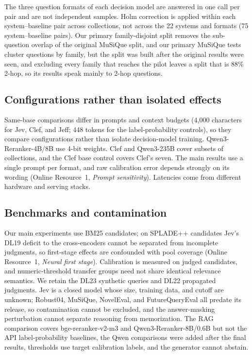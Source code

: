 The three question formats of each decision model are answered in one call per pair and are not independent samples. Holm correction is applied within each system--baseline pair across collections, not across the 22 systems and formats (75 system--baseline pairs). Our primary family-disjoint split removes the sub-question overlap of the original MuSiQue split, and our primary MuSiQue tests cluster questions by family, but the split was built after the original results were seen, and excluding every family that reaches the pilot leaves a split that is 88\% 2-hop, so its results speak mainly to 2-hop questions.

\subsection{Configurations rather than isolated effects}

Same-base comparisons differ in prompts and context budgets (4{,}000 characters for Jev, Clef, and Jeff; 448 tokens for the label-probability controls), so they compare configurations rather than isolate decision-model training. Qwen3-Reranker-4B/8B use 4-bit weights. Clef and Qwen3-235B cover subsets of collections, and the Clef base control covers Clef's seven. The main results use a single prompt per format, and raw calibration error depends strongly on its wording (Online Resource~1, \emph{Prompt sensitivity}). Latencies come from different hardware and serving stacks.

\subsection{Benchmarks and contamination}

Our main experiments use BM25 candidates; on SPLADE++ candidates Jev's DL19 deficit to the cross-encoders cannot be separated from incomplete judgments, so first-stage effects are confounded with pool coverage (Online Resource~1, \emph{Neural first stage}). Calibration is measured on judged candidates, and numeric-threshold transfer groups need not share identical relevance semantics. We retain the DL23 synthetic queries and DL22 propagated judgments. Jev is a closed model whose size, training data, and cutoff are unknown; Robust04, MuSiQue, NovelEval, and FutureQueryEval all predate its release, so contamination cannot be excluded, and the answer-masking perturbation cannot separate reasoning from memorization. The RAG comparison covers bge-reranker-v2-m3 and Qwen3-Reranker-8B/0.6B but not the API label-probability baselines, the Qwen comparisons were added after the final results, thresholds use target calibration labels, and the generator cannot abstain.


